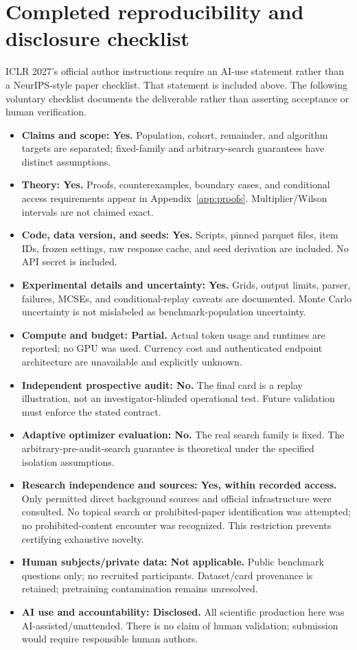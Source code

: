 \documentclass{article}
\begin{document}
\section{Completed reproducibility and disclosure checklist}
ICLR 2027's official author instructions require an AI-use statement rather than a NeurIPS-style paper checklist. That statement is included above. The following voluntary checklist documents the deliverable rather than asserting acceptance or human verification.
\begin{itemize}
\item \textbf{Claims and scope: Yes.} Population, cohort, remainder, and algorithm targets are separated; fixed-family and arbitrary-search guarantees have distinct assumptions.
\item \textbf{Theory: Yes.} Proofs, counterexamples, boundary cases, and conditional access requirements appear in Appendix~\ref{app:proofs}. Multiplier/Wilson intervals are not claimed exact.
\item \textbf{Code, data version, and seeds: Yes.} Scripts, pinned parquet files, item IDs, frozen settings, raw response cache, and seed derivation are included. No API secret is included.
\item \textbf{Experimental details and uncertainty: Yes.} Grids, output limits, parser, failures, MCSEs, and conditional-replay caveats are documented. Monte Carlo uncertainty is not mislabeled as benchmark-population uncertainty.
\item \textbf{Compute and budget: Partial.} Actual token usage and runtimes are reported; no GPU was used. Currency cost and authenticated endpoint architecture are unavailable and explicitly unknown.
\item \textbf{Independent prospective audit: No.} The final card is a replay illustration, not an investigator-blinded operational test. Future validation must enforce the stated contract.
\item \textbf{Adaptive optimizer evaluation: No.} The real search family is fixed. The arbitrary-pre-audit-search guarantee is theoretical under the specified isolation assumptions.
\item \textbf{Research independence and sources: Yes, within recorded access.} Only permitted direct background sources and official infrastructure were consulted. No topical search or prohibited-paper identification was attempted; no prohibited-content encounter was recognized. This restriction prevents certifying exhaustive novelty.
\item \textbf{Human subjects/private data: Not applicable.} Public benchmark questions only; no recruited participants. Dataset/card provenance is retained; pretraining contamination remains unresolved.
\item \textbf{AI use and accountability: Disclosed.} All scientific production here was AI-assisted/unattended. There is no claim of human validation; submission would require responsible human authors.
\end{itemize}
\end{document}
